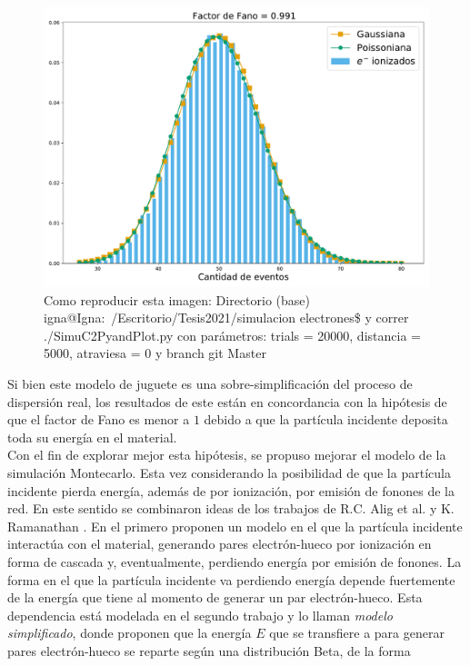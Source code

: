 \begin{figure}[H]
    \centering
    \includegraphics[scale=0.35]{Figs/Orden0_fano1.pdf}
    \caption{\footnotesize{Como reproducir esta imagen: Directorio (base) igna@Igna:~/Escritorio/Tesis2021/simulacion electrones\$ y correr ./SimuC2PyandPlot.py con parámetros: trials = 20000, distancia = 5000, atraviesa = 0 y branch git Master}}
    \label{fig:SimulacionOrden0Fano1}
\end{figure}
\noindent Si bien este modelo de juguete es una sobre-simplificación del proceso de dispersión real, los resultados de este están en concordancia con la hipótesis de que el factor de Fano es menor a $1$ debido a que la partícula incidente deposita toda su energía en el material.\\
\indent Con el fin de explorar mejor esta hipótesis, se propuso mejorar el modelo de la simulación Montecarlo. Esta vez considerando la posibilidad de que la partícula incidente pierda energía, además de por ionización, por emisión de fonones de la red. En este sentido se combinaron ideas de los trabajos de R.C. Alig et al.\cite{Alig} y K. Ramanathan \cite{Ramanathan}. En el primero proponen un modelo en el que la partícula incidente interactúa con el material, generando pares electrón-hueco por ionización en forma de cascada y, eventualmente, perdiendo energía por emisión de fonones. La forma en el que la partícula incidente va perdiendo energía depende fuertemente de la energía que tiene al momento de generar un par electrón-hueco. Esta dependencia está modelada en el segundo trabajo y lo llaman \textit{modelo simplificado}, donde proponen que la energía $E$ que se transfiere a para generar pares electrón-hueco se reparte según una distribución Beta, de la forma
